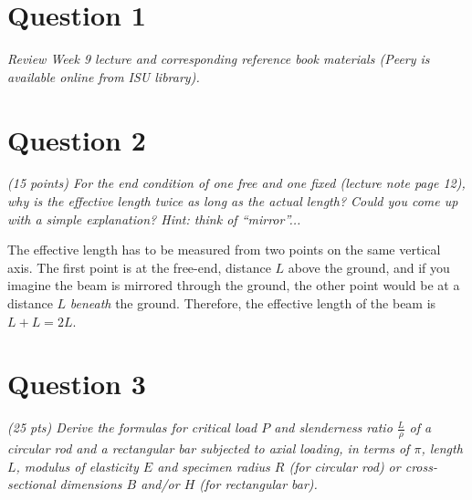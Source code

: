 \documentclass[12 pt]{article}
\begin{document}
\section*{Question 1}
\textit{Review Week \num{9} lecture and corresponding reference book materials (Peery is available online from ISU library).}

\section*{Question 2}
\textit{(\num{15} points) For the end condition of one free and one fixed (lecture note page \num{12}), why is the effective length twice as long as the actual length? Could you come up with a simple explanation? Hint: think of “mirror”...}

The effective length has to be measured from two points on the same vertical axis. The first point is at the free-end, distance $L$ above the ground, and if you imagine the beam is mirrored through the ground, the other point would be at a distance $L$ \textit{beneath} the ground. Therefore, the effective length of the beam is $L+L=2L$.

\section*{Question 3}
\textit{(\num{25} pts) Derive the formulas for critical load $P$ and slenderness ratio $\frac{L}{\rho}$ of a circular rod and a rectangular bar subjected to axial loading, in terms of $\pi$, length $L$, modulus of elasticity $E$ and specimen radius $R$ (for circular rod) or cross-sectional dimensions $B$ and/or $H$ (for rectangular bar).}
\end{document}
